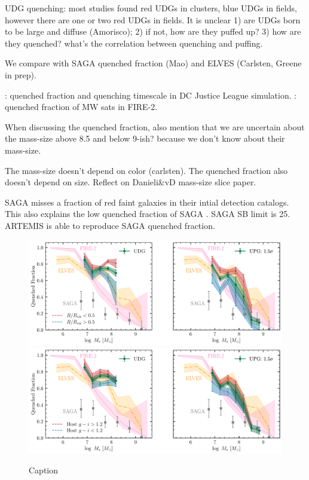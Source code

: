 \documentclass[twocolumn,astrosymb,twocolappendix]{aastex631}
\begin{document}
\begin{CJK*}{UTF8}{gbsn}
UDG quenching: most studies found red UDGs in clusters, blue UDGs in fields, however there are one or two red UDGs in fields. It is unclear 1) are UDGs born to be large and diffuse (Amorisco); 2) if not, how are they puffed up? 3) how are they quenched? what's the correlation between quenching and puffing. 

We compare with SAGA quenched fraction (Mao) and ELVES (Carlsten, Greene in prep).

\citep{Baxter2021}

\citep{Akins2021}: quenched fraction and quenching timescale in DC Justice League simulation.
\citep{Samuel2022}: quenched fraction of MW sats in FIRE-2.

When discussing the quenched fraction, also mention that we are uncertain about the mass-size above 8.5 and below 9-ish? because we don't know about their mass-size.

The mass-size doesn't depend on color (carlsten). The quenched fraction also doesn't depend on size. Reflect on Danieli\&vD mass-size slice paper. 

SAGA misses a fraction of red faint galaxies in their intial detection catalogs. This also explains the low quenched fraction of SAGA \citep{CarlstenELVES2022}.
SAGA SB limit is 25. ARTEMIS is able to reproduce SAGA quenched fraction. 


\begin{figure}
	\vbox{ 
		\centering
		\includegraphics[width=1\linewidth]{quenched_frac_dist2host.pdf}
		\includegraphics[width=1\linewidth]{quenched_frac_host_color.pdf}
	}
    \caption{Caption}
    \label{fig:qfrac_dist2host}
\end{figure}


\end{CJK*}
\end{document}

